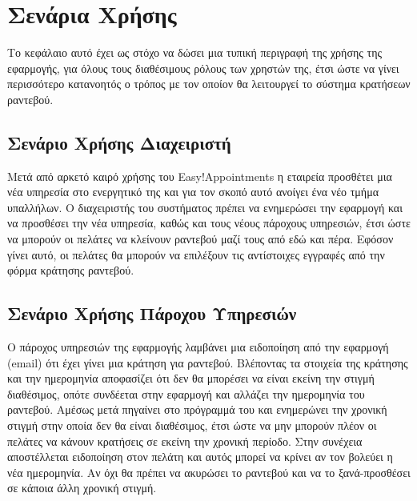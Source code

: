 
\chapter{Σενάρια Χρήσης}
Το κεφάλαιο αυτό έχει ως στόχο να δώσει μια τυπική περιγραφή της χρήσης της εφαρμογής, για όλους τους διαθέσιμους ρόλους των χρηστών της, έτσι ώστε να γίνει περισσότερο κατανοητός ο τρόπος με τον οποίον θα λειτουργεί το σύστημα κρατήσεων ραντεβού.

\section{Σενάριο Χρήσης Διαχειριστή}
Μετά από αρκετό καιρό χρήσης του Easy!Appointments η εταιρεία προσθέτει μια νέα υπηρεσία στο ενεργητικό της και για τον σκοπό αυτό ανοίγει ένα νέο τμήμα υπαλλήλων. Ο διαχειριστής του συστήματος πρέπει να ενημερώσει την εφαρμογή και να προσθέσει την νέα υπηρεσία, καθώς και τους νέους πάροχους υπηρεσιών, έτσι ώστε να μπορούν οι πελάτες να κλείνουν ραντεβού μαζί τους από εδώ και πέρα. Εφόσον γίνει αυτό, οι πελάτες θα μπορούν να επιλέξουν τις αντίστοιχες εγγραφές από την φόρμα κράτησης ραντεβού.

\section{Σενάριο Χρήσης Πάροχου Υπηρεσιών}
Ο πάροχος υπηρεσιών της εφαρμογής λαμβάνει μια ειδοποίηση από την εφαρμογή (email) ότι έχει γίνει μια κράτηση για ραντεβού. Βλέποντας τα στοιχεία της κράτησης και την ημερομηνία αποφασίζει ότι δεν θα μπορέσει να είναι εκείνη την στιγμή διαθέσιμος, οπότε συνδέεται στην εφαρμογή και αλλάζει την ημερομηνία του ραντεβού. Αμέσως μετά πηγαίνει στο πρόγραμμά του και ενημερώνει την χρονική στιγμή στην οποία δεν θα είναι διαθέσιμος, έτσι ώστε να μην μπορούν πλέον οι πελάτες να κάνουν κρατήσεις σε εκείνη την χρονική περίοδο. Στην συνέχεια αποστέλλεται ειδοποίηση στον πελάτη και αυτός μπορεί να κρίνει αν τον βολεύει η νέα ημερομηνία. Αν όχι θα πρέπει να ακυρώσει το ραντεβού και να το ξανά-προσθέσει σε κάποια άλλη χρονική στιγμή. 

